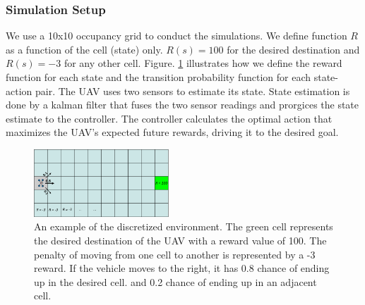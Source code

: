 \documentclass[letterpaper, 10 pt, conference]{ieeeconf}  %
\begin{document}
\subsubsection{Simulation Setup}
We use a 10x10 occupancy grid to conduct the simulations. We define function $R$ as a function of the cell (state) only. $R(s) = 100$ for the desired destination and $R(s) = -3$ for any other cell. Figure. \ref{fig:sim-env} illustrates how we define the reward function for each state and the transition probability function for each state-action pair. The UAV uses two sensors to estimate its state. State estimation is done by a kalman filter that fuses the two sensor readings and prorgices the state estimate to the controller. The controller calculates the optimal action that maximizes the UAV's expected future rewards, driving it to the desired goal.
\begin{figure}[h]
\centering
\includegraphics[width=0.45\textwidth]{sim-env}
\caption{An example of the discretized environment. The green cell represents the desired destination of the UAV with a reward value of 100. The penalty of moving from one cell to another is represented by a -3 reward. If the vehicle moves to the right, it has 0.8 chance of ending up in the desired cell. and 0.2 chance of ending up in an adjacent cell.}
 \label{fig:sim-env}
\end{figure}
\end{document}
